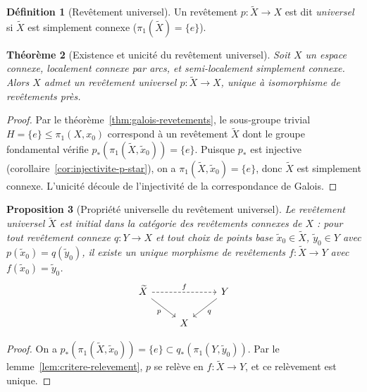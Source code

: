 \documentclass[12pt,a4paper,openany]{book}
\theoremstyle{definition}
\newtheorem{definition}{Définition}[chapter]
\theoremstyle{plain}
\newtheorem{theoreme}[definition]{Théorème}
\newtheorem{proposition}[definition]{Proposition}
\theoremstyle{remark}
\begin{document}
\begin{definition}[Revêtement universel]\label{def:rev-universel}
Un revêtement $p \colon \widetilde{X} \to X$ est dit \emph{universel} si $\widetilde{X}$
est simplement connexe ($\pi_1(\widetilde{X}) = \{e\}$).
\end{definition}

\begin{theoreme}[Existence et unicité du revêtement universel]\label{thm:rev-universel}
Soit $X$ un espace connexe, localement connexe par arcs, et semi-localement simplement connexe.
Alors $X$ admet un revêtement universel $p \colon \widetilde{X} \to X$, unique à isomorphisme
de revêtements près.
\end{theoreme}

\begin{proof}
Par le théorème~\ref{thm:galois-revetements}, le sous-groupe trivial $H = \{e\} \leq \pi_1(X, x_0)$
correspond à un revêtement $\widetilde{X}$ dont le groupe fondamental vérifie
$p_*(\pi_1(\widetilde{X}, \tilde{x}_0)) = \{e\}$. Puisque $p_*$ est injective
(corollaire~\ref{cor:injectivite-p-star}), on a $\pi_1(\widetilde{X}, \tilde{x}_0) = \{e\}$,
donc $\widetilde{X}$ est simplement connexe. L'unicité découle de l'injectivité de la
correspondance de Galois.
\end{proof}

\begin{proposition}[Propriété universelle du revêtement universel]\label{prop:propriete-universelle-rev}
Le revêtement universel $\widetilde{X}$ est initial dans la catégorie des revêtements connexes
de $X$ : pour tout revêtement connexe $q \colon Y \to X$ et tout choix de points base
$\tilde{x}_0 \in \widetilde{X}$, $\tilde{y}_0 \in Y$ avec $p(\tilde{x}_0) = q(\tilde{y}_0)$,
il existe un unique morphisme de revêtements $f \colon \widetilde{X} \to Y$ avec
$f(\tilde{x}_0) = \tilde{y}_0$.
\[
\begin{tikzcd}
\widetilde{X} \arrow[rr, dashed, "f"] \arrow[dr, "p"'] & & Y \arrow[dl, "q"] \\
& X &
\end{tikzcd}
\]
\end{proposition}

\begin{proof}
On a $p_*(\pi_1(\widetilde{X}, \tilde{x}_0)) = \{e\} \subset q_*(\pi_1(Y, \tilde{y}_0))$.
Par le lemme~\ref{lem:critere-relevement}, $p$ se relève en $f \colon \widetilde{X} \to Y$,
et ce relèvement est unique.
\end{proof}
\end{document}

